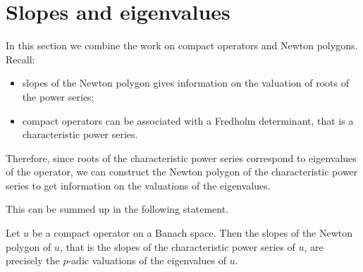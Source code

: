 \chapter{Slopes and eigenvalues}

In this section we combine the work on compact operators and Newton polygons.
Recall:
\begin{itemize}
  \item slopes of the Newton polygon gives information on the valuation of roots of the
    power series; %
  \item compact operators can be associated with a Fredholm determinant, that is a characteristic
    power series.
\end{itemize}

Therefore, since roots of the characteristic power series %
correspond to eigenvalues of the operator, we can construct the Newton polygon of the characteristic
power series to get information on the valuations of the eigenvalues.

This can be summed up in the following statement.

\begin{lemma}
  Let $u$ be a compact operator on a Banach space. Then the slopes of the Newton polygon of $u$,
  that is the slopes of the characteristic power series of $u$, are precisely the $p$-adic valuations
  of the eigenvalues of $u$.
\end{lemma}

